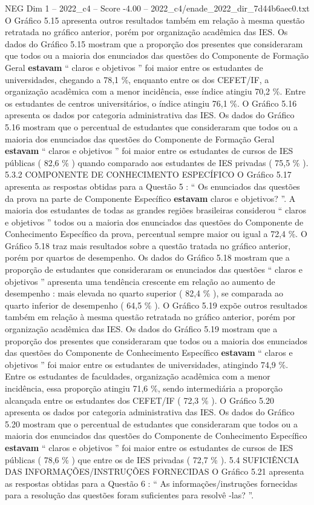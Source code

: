\begin{textsample}{NEG Dim 1 – 2022\_c4 – Score -4.00 – 2022\_c4/enade\_2022\_dir\_7d44b6aec0.txt}
O Gráfico 5.15 apresenta outros resultados também em relação à mesma questão retratada no gráfico anterior, porém por organização acadêmica das IES.
Os dados do Gráfico 5.15 mostram que a proporção dos presentes que consideraram que todos ou a maioria dos enunciados das questões do Componente de Formação Geral \textbf{estavam} “ claros e objetivos ” foi maior entre os estudantes de universidades, chegando a 78,1 \%, enquanto entre os dos CEFET/IF, a organização acadêmica com a menor incidência, esse índice atingiu 70,2 \%.
Entre os estudantes de centros universitários, o índice atingiu 76,1 \%.
O Gráfico 5.16 apresenta os dados por categoria administrativa das IES.
Os dados do Gráfico 5.16 mostram que o percentual de estudantes que consideraram que todos ou a maioria dos enunciados das questões do Componente de Formação Geral \textbf{estavam} “ claros e objetivos ” foi maior entre os estudantes de cursos de IES públicas ( 82,6 \% ) quando comparado aos estudantes de IES privadas ( 75,5 \% ). 5.3.2 COMPONENTE DE CONHECIMENTO ESPECÍFICO O Gráfico 5.17 apresenta as respostas obtidas para a Questão 5 : “ Os enunciados das questões da prova na parte de Componente Específico \textbf{estavam} claros e objetivos? ”.
A maioria dos estudantes de todas as grandes regiões brasileiras considerou “ claros e objetivos ” todos ou a maioria dos enunciados das questões do Componente de Conhecimento Específico da prova, percentual sempre maior ou igual a 72,4 \%.
O Gráfico 5.18 traz mais resultados sobre a questão tratada no gráfico anterior, porém por quartos de desempenho.
Os dados do Gráfico 5.18 mostram que a proporção de estudantes que consideraram os enunciados das questões “ claros e objetivos ” apresenta uma tendência crescente em relação ao aumento de desempenho : mais elevada no quarto superior ( 82,4 \% ), se comparada ao quarto inferior de desempenho ( 64,5 \% ).
O Gráfico 5.19 expõe outros resultados também em relação à mesma questão retratada no gráfico anterior, porém por organização acadêmica das IES.
Os dados do Gráfico 5.19 mostram que a proporção dos presentes que consideraram que todos ou a maioria dos enunciados das questões do Componente de Conhecimento Específico \textbf{estavam} “ claros e objetivos ” foi maior entre os estudantes de universidades, atingindo 74,9 \%.
Entre os estudantes de faculdades, organização acadêmica com a menor incidência, essa proporção atingiu 71,6 \%, sendo intermediária a proporção alcançada entre os estudantes dos CEFET/IF ( 72,3 \% ).
O Gráfico 5.20 apresenta os dados por categoria administrativa das IES.
Os dados do Gráfico 5.20 mostram que o percentual de estudantes que consideraram que todos ou a maioria dos enunciados das questões do Componente de Conhecimento Específico \textbf{estavam} “ claros e objetivos ” foi maior entre os estudantes de cursos de IES públicas ( 78,6 \% ) que entre os de IES privadas ( 72,7 \% ). 5.4 SUFICIÊNCIA DAS INFORMAÇÕES/INSTRUÇÕES FORNECIDAS O Gráfico 5.21 apresenta as respostas obtidas para a Questão 6 : “ As informações/instruções fornecidas para a resolução das questões foram suficientes para resolvê -las? ”.

\end{textsample}

